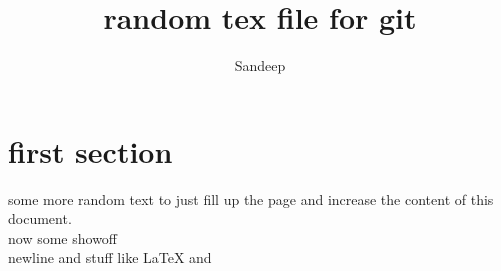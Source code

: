 \documentclass {article}
\author {Sandeep}
\title {random tex file for git}
\begin{document}
\maketitle
\section{first section}
some more random text to just fill up the page and increase the content of this document.\\
now some showoff\cite{sandu} \\
newline and stuff like \LaTeX{} and \cite{sandbook}



\end{document}
